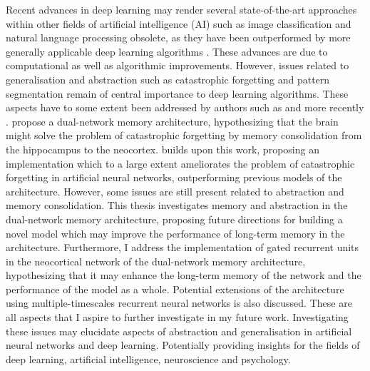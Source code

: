 Recent advances in deep learning may render several state-of-the-art approaches within other fields of artificial intelligence (AI) such as image classification and natural language processing obsolete, as they have been outperformed by more generally applicable deep learning algorithms \citep{LeCun2015, Schmidhuber2014}. These advances are due to computational as well as algorithmic improvements.
However, issues related to generalisation and abstraction such as catastrophic forgetting and pattern segmentation remain of central importance to deep learning algorithms. These aspects have to some extent been addressed by authors such as \cite{McClelland1995} and more recently \cite{Hattori2014}. \cite{McClelland1995} propose a dual-network memory architecture, hypothesizing that the brain might solve the problem of catastrophic forgetting by memory consolidation from the hippocampus to the neocortex. \citet{Hattori2014} builds upon this work, proposing an implementation which to a large extent ameliorates the problem of catastrophic forgetting in artificial neural networks, outperforming previous models of the architecture. However, some issues are still present related to abstraction and memory consolidation.
This thesis investigates memory and abstraction in the dual-network memory architecture, proposing future directions for building a novel model which may improve the performance of long-term memory in the architecture. Furthermore, I address the implementation of gated recurrent units in the neocortical network of the dual-network memory architecture, hypothesizing that it may enhance the long-term memory of the network and the performance of the model as a whole. Potential extensions of the architecture using multiple-timescales recurrent neural networks is also discussed. These are all aspects that I aspire to further investigate in my future work.
Investigating these issues may elucidate aspects of abstraction and generalisation in artificial neural networks and deep learning. Potentially providing insights for the fields of deep learning, artificial intelligence, neuroscience and psychology.


\clearpage